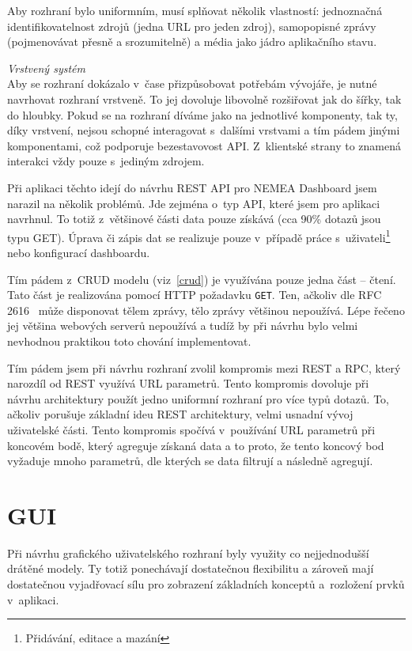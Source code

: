 \begin{description}
        Aby rozhraní bylo uniformním, musí splňovat několik vlastností: jednoznačná identifikovatelnost zdrojů (jedna URL pro jeden zdroj), samopopisné zprávy (pojmenovávat přesně a srozumitelně) a média jako jádro aplikačního stavu.

    \item \textit{Vrstvený systém} \\
        Aby se rozhraní dokázalo v~čase přizpůsobovat potřebám vývojáře, je nutné navrhovat rozhraní vrstveně. To jej dovoluje libovolně rozšiřovat jak do šířky, tak do hloubky. Pokud se na rozhraní díváme jako na jednotlivé komponenty, tak ty, díky vrstvení, nejsou schopné interagovat s~dalšími vrstvami a tím pádem jinými komponentami, což podporuje bezestavovost API. Z~klientské strany to znamená interakci vždy pouze s~jediným zdrojem.
        
\end{description}

Při aplikaci těchto idejí do návrhu REST API pro NEMEA Dashboard jsem narazil na několik problémů. Jde zejména o~typ API, které jsem pro aplikaci navrhnul. To totiž z~většinové části data pouze získává (cca 90\% dotazů jsou typu GET). Úprava či zápis dat se realizuje pouze v~případě práce s~uživateli\footnote{Přidávání, editace a mazání } nebo konfigurací dashboardu.

Tím pádem z~CRUD modelu (viz~\ref{crud}) je využívána pouze jedna část -- čtení. Tato část je realizována pomocí HTTP požadavku \texttt{GET}. Ten, ačkoliv dle RFC 2616~\cite{rfc:http} může disponovat tělem zprávy, tělo zprávy většinou nepoužívá. Lépe řečeno jej většina webových serverů nepoužívá a tudíž by při návrhu bylo velmi nevhodnou praktikou toto chování implementovat. 

Tím pádem jsem při návrhu rozhraní zvolil kompromis mezi REST a RPC, který narozdíl od REST využívá URL parametrů. Tento kompromis dovoluje při návrhu architektury použít jedno uniformní rozhraní pro více typů dotazů. To, ačkoliv porušuje základní ideu REST architektury, velmi usnadní vývoj uživatelské části. Tento kompromis spočívá v~používání URL parametrů při koncovém bodě, který agreguje získaná data a to proto, že tento koncový bod vyžaduje mnoho parametrů, dle kterých se data filtrují a následně agregují.

\section{GUI}

Při návrhu grafického uživatelského rozhraní byly využity co nejjednodušší drátěné modely. Ty totiž ponechávají dostatečnou flexibilitu a zároveň mají dostatečnou vyjadřovací sílu pro zobrazení základních konceptů a~rozložení prvků v~aplikaci.

